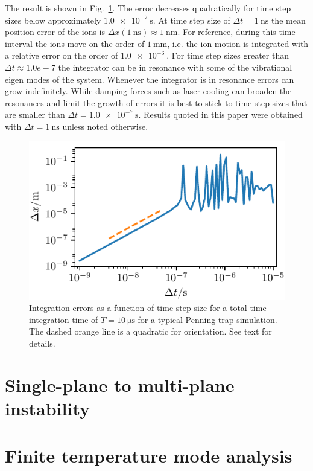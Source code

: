 \documentclass[aps, pra, preprint]{revtex4-1}
\begin{document}
The result is shown in Fig.~\ref{fig:convergence}. The error
decreases quadratically for time step sizes below approximately
$\SI{1.0e-7}{\second}$. At time step size of $\Delta t =
\SI{1}{\nano\second}$ the mean position error of the ions is
$\Delta x(\SI{1}{\nano\second})\approx \SI{1}{\nano\meter}$. For
reference, during this time interval the ions move on the order
of $\SI{1}{\milli\meter}$, i.e. the ion motion is integrated with
a relative error on the order of $\SI{1.0e-6}{}$. For time step
sizes greater than $\Delta t\approx 1.0e-7$ the integrator can be in
resonance with some of the vibrational eigen modes of the system.
Whenever the integrator is in resonance errors can grow
indefinitely. While damping forces such as laser cooling can
broaden the resonances and limit the growth of errors it is best
to stick to time step sizes that are smaller than $\Delta t =
\SI{1.0e-7}{\second}$. Results quoted in this paper were obtained
with $\Delta t = \SI{1}{\nano\second}$ unless noted otherwise.
\begin{figure}
  \includegraphics{./figures/fig_convergence.pdf}
  \caption{Integration errors as a function of time step size for
    a total time integration time of $T=\SI{10}{\us}$ for a
    typical Penning trap simulation. The dashed orange line is a
    quadratic for orientation. See text for details.}
  \label{fig:convergence}
\end{figure}


\section{Single-plane to multi-plane instability}
\label{sec:validation}


\section{Finite temperature mode analysis}
\end{document}
